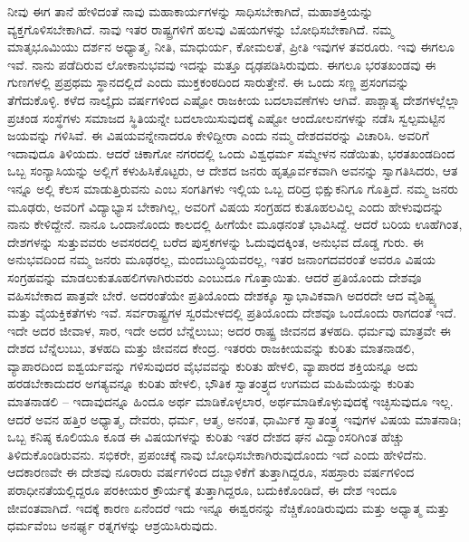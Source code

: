 ನೀವು ಈಗ ತಾನೆ ಹೇಳಿದಂತೆ ನಾವು ಮಹಾಕಾರ್ಯಗಳನ್ನು ಸಾಧಿಸಬೇಕಾಗಿದೆ, ಮಹಾಶಕ್ತಿಯನ್ನು ವ್ಯಕ್ತಗೊಳಿಸಬೇಕಾಗಿದೆ. ನಾವು ಇತರ ರಾಷ್ಟ್ರಗಳಿಗೆ ಹಲವು ವಿಷಯಗಳನ್ನು ಬೋಧಿಸಬೇಕಾಗಿದೆ. ನಮ್ಮ ಮಾತೃಭೂಮಿಯು ದರ್ಶನ ಅಧ್ಯಾತ್ಮ, ನೀತಿ, ಮಾಧುರ್ಯ, ಕೋಮಲತೆ, ಪ್ರೀತಿ ಇವುಗಳ ತವರೂರು. ಇವು ಈಗಲೂ ಇವೆ. ನಾನು ಪಡೆದಿರುವ ಲೋಕಾನುಭವವು ಇದನ್ನು ಮತ್ತೂ ದೃಢಪಡಿಸಿರುವುದು. ಈಗಲೂ ಭರತಖಂಡವು ಈ ಗುಣಗಳಲ್ಲಿ ಪ್ರಪ್ರಥಮ ಸ್ಥಾನದಲ್ಲಿದೆ ಎಂದು ಮುಕ್ತಕಂಠದಿಂದ ಸಾರುತ್ತೇನೆ. ಈ ಒಂದು ಸಣ್ಣ ಪ್ರಸಂಗವನ್ನು ತೆಗೆದುಕೊಳ್ಳಿ. ಕಳೆದ ನಾಲ್ಕೈದು ವರ್ಷಗಳಿಂದ ಎಷ್ಟೋ ರಾಜಕೀಯ ಬದಲಾವಣೆಗಳು ಆಗಿವೆ. ಪಾಶ್ಚಾತ್ಯ ದೇಶಗಳಲ್ಲೆಲ್ಲಾ ಪ್ರಚಂಡ ಸಂಸ್ಥೆಗಳು ಸಮಾಜದ ಸ್ಥಿತಿಯನ್ನೇ ಬದಲಾಯಿಸುವುದಕ್ಕೆ ಎಷ್ಟೋ ಆಂದೋಲನಗಳನ್ನು ನಡೆಸಿ ಸ್ವಲ್ಪಮಟ್ಟಿನ ಜಯವನ್ನು ಗಳಿಸಿವೆ. ಈ ವಿಷಯವನ್ನೇನಾದರೂ ಕೇಳಿದ್ದೀರಾ ಎಂದು ನಮ್ಮ ದೇಶದವರನ್ನು ವಿಚಾರಿಸಿ. ಅವರಿಗೆ ಇದಾವುದೂ ತಿಳಿಯದು. ಆದರೆ ಚಿಕಾಗೋ ನಗರದಲ್ಲಿ ಒಂದು ವಿಶ್ವಧರ್ಮ ಸಮ್ಮೇಳನ ನಡೆಯಿತು, ಭರತಖಂಡದಿಂದ ಒಬ್ಬ ಸಂನ್ಯಾಸಿಯನ್ನು ಅಲ್ಲಿಗೆ ಕಳುಹಿಸಿಕೊಟ್ಟರು, ಆ ದೇಶದ ಜನರು ಹೃತ್ಪೂರ್ವಕವಾಗಿ ಅವನನ್ನು ಸ್ವಾಗತಿಸಿದರು, ಆತ ಇನ್ನೂ ಅಲ್ಲಿ ಕೆಲಸ ಮಾಡುತ್ತಿರುವನು ಎಂಬ ಸಂಗತಿಗಳು ಇಲ್ಲಿಯ ಒಬ್ಬ ದರಿದ್ರ ಭಿಕ್ಷುಕನಿಗೂ ಗೊತ್ತಿದೆ. ನಮ್ಮ ಜನರು ಮೂಢರು, ಅವರಿಗೆ ವಿದ್ಯಾಭ್ಯಾಸ ಬೇಕಾಗಿಲ್ಲ, ಅವರಿಗೆ ವಿಷಯ ಸಂಗ್ರಹದ ಕುತೂಹಲವಿಲ್ಲ ಎಂದು ಹೇಳುವುದನ್ನು ನಾನು ಕೇಳಿದ್ದೇನೆ. ನಾನೂ ಒಂದಾನೊಂದು ಕಾಲದಲ್ಲಿ ಹೀಗೆಯೇ ಮೂಢನಂತೆ ಭಾವಿಸಿದ್ದೆ. ಆದರೆ ಬರಿಯ ಊಹೆಗಿಂತ, ದೇಶಗಳನ್ನು ಸುತ್ತುವವರು ಅವಸರದಲ್ಲಿ ಬರೆದ ಪುಸ್ತಕಗಳನ್ನು ಓದುವುದಕ್ಕಿಂತ, ಅನುಭವ ದೊಡ್ಡ ಗುರು. ಈ ಅನುಭವದಿಂದ ನಮ್ಮ ಜನರು ಮೂಢರಲ್ಲ, ಮಂದಬುದ್ಧಿಯವರಲ್ಲ, ಇತರ ಜನಾಂಗದವರಂತೆ ಅವರೂ ವಿಷಯ ಸಂಗ್ರಹವನ್ನು ಮಾಡಲು\break ಕುತೂಹಲಿಗಳಾಗಿರುವರು ಎಂಬುದೂ ಗೊತ್ತಾಯಿತು. ಆದರೆ ಪ್ರತಿಯೊಂದು ದೇಶವೂ ವಹಿಸಬೇಕಾದ ಪಾತ್ರವೇ ಬೇರೆ. ಅದರಂತೆಯೇ ಪ್ರತಿಯೊಂದು ದೇಶಕ್ಕೂ ಸ್ವಾಭಾವಿಕವಾಗಿ ಅದರದೇ ಆದ ವೈಶಿಷ್ಟ್ಯ ಮತ್ತು ವೈಯಕ್ತಿಕತೆಗಳು ಇವೆ. ಸರ್ವರಾಷ್ಟ್ರಗಳ ಸ್ವರಮೇಳದಲ್ಲಿ ಪ್ರತಿಯೊಂದು ದೇಶವೂ ಒಂದೊಂದು ರಾಗದಂತೆ ಇದೆ. ಇದೇ ಅದರ ಜೀವಾಳ, ಸಾರ, ಇದೇ ಅದರ ಬೆನ್ನೆಲುಬು; ಅದರ ರಾಷ್ಟ್ರ ಜೀವನದ ತಳಹದಿ. ಧರ್ಮವು ಮಾತ್ರವೇ ಈ ದೇಶದ ಬೆನ್ನೆಲುಬು, ತಳಹದಿ ಮತ್ತು ಜೀವನದ ಕೇಂದ್ರ. ಇತರರು ರಾಜಕೀಯವನ್ನು ಕುರಿತು ಮಾತನಾಡಲಿ, ವ್ಯಾಪಾರದಿಂದ ಐಶ್ವರ್ಯವನ್ನು ಗಳಿಸುವುದರ ವೈಭವವನ್ನು ಕುರಿತು ಹೇಳಲಿ, ವ್ಯಾಪಾರದ ಶಕ್ತಿಯನ್ನೂ ಅದು ಹರಡಬೇಕಾದುದರ ಅಗತ್ಯವನ್ನೂ ಕುರಿತು ಹೇಳಲಿ, ಭೌತಿಕ ಸ್ವಾತಂತ್ರ್ಯದ ಉಗಮದ ಮಹಿಮೆಯನ್ನು ಕುರಿತು ಮಾತನಾಡಲಿ – ಇದಾವುದನ್ನೂ ಹಿಂದೂ ಅರ್ಥ ಮಾಡಿಕೊಳ್ಳಲಾರ, ಅರ್ಥಮಾಡಿಕೊಳ್ಳುವುದಕ್ಕೆ ಇಚ್ಛಿಸುವುದೂ ಇಲ್ಲ. ಆದರೆ ಅವನ ಹತ್ತಿರ ಅಧ್ಯಾತ್ಮ, ದೇವರು, ಧರ್ಮ, ಆತ್ಮ, ಅನಂತ, ಧಾರ್ಮಿಕ ಸ್ವಾತಂತ್ರ್ಯ ಇವುಗಳ ವಿಷಯ ಮಾತನಾಡಿ; ಒಬ್ಬ ಕನಿಷ್ಠ ಕೂಲಿಯೂ ಕೂಡ ಈ ವಿಷಯಗಳನ್ನು ಕುರಿತು ಇತರ ದೇಶದ ಘನ ವಿದ್ವಾಂಸರಿಗಿಂತ ಹೆಚ್ಚು ತಿಳಿದುಕೊಂಡಿರುವನು. ಸಭಿಕರೇ, ಪ್ರಪಂಚಕ್ಕೆ ನಾವು ಬೋಧಿಸಬೇಕಾಗಿರುವುದೊಂದು ಇದೆ ಎಂದು ಹೇಳಿದೆನು. ಆದಕಾರಣವೇ ಈ ದೇಶವು ನೂರಾರು ವರ್ಷಗಳಿಂದ ದಬ್ಬಾಳಿಕೆಗೆ ತುತ್ತಾಗಿದ್ದರೂ, ಸಹಸ್ರಾರು ವರ್ಷಗಳಿಂದ ಪರಾಧೀನತೆಯಲ್ಲಿದ್ದರೂ ಪರಕೀಯರ ಕ್ರೌರ್ಯಕ್ಕೆ ತುತ್ತಾಗಿದ್ದರೂ, ಬದುಕಿಕೊಂಡಿದೆ, ಈ ದೇಶ ಇಂದೂ ಜೀವಂತವಾಗಿದೆ. ಇದಕ್ಕೆ ಕಾರಣ ಏನೆಂದರೆ ಇದು ಇನ್ನೂ ಈಶ್ವರನನ್ನು ನೆಚ್ಚಿಕೊಂಡಿರುವುದು ಮತ್ತು ಅಧ್ಯಾತ್ಮ ಮತ್ತು ಧರ್ಮವೆಂಬ ಅನರ್ಘ್ಯ ರತ್ನಗಳನ್ನು ಆಶ್ರಯಿಸಿರುವುದು. 

